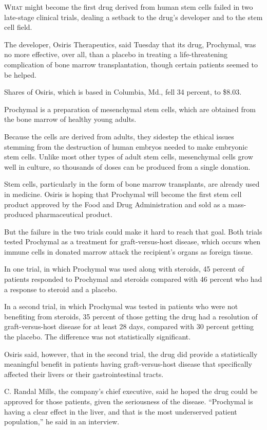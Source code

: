 ﻿\documentclass[12pt]{article}
\begin{document}
\lettrine{W}{hat} might become the first drug derived from human stem cells failed in two late-stage
clinical trials, dealing a setback to the drug's developer and to the stem cell field.

The developer, Osiris Therapeutics, said Tuesday that its drug, Prochymal, was no more effective,
over all, than a placebo in treating a life-threatening complication of bone marrow transplantation,
though certain patients seemed to be helped.

Shares of Osiris, which is based in Columbia, Md., fell 34 percent, to \$8.03.

Prochymal is a preparation of mesenchymal stem cells, which are obtained from the bone marrow of
healthy young adults.

Because the cells are derived from adults, they sidestep the ethical issues stemming from the
destruction of human embryos needed to make embryonic stem cells. Unlike most other types of adult
stem cells, mesenchymal cells grow well in culture, so thousands of doses can be produced from a
single donation.

Stem cells, particularly in the form of bone marrow transplants, are already used in medicine.
Osiris is hoping that Prochymal will become the first stem cell product approved by the Food and
Drug Administration and sold as a mass-produced pharmaceutical product.

But the failure in the two trials could make it hard to reach that goal. Both trials tested
Prochymal as a treatment for graft-versus-host disease, which occurs when immune cells in donated
marrow attack the recipient's organs as foreign tissue.

In one trial, in which Prochymal was used along with steroids, 45 percent of patients responded to
Prochymal and steroids compared with 46 percent who had a response to steroid and a placebo.

In a second trial, in which Prochymal was tested in patients who were not benefiting from steroids,
35 percent of those getting the drug had a resolution of graft-versus-host disease for at least 28
days, compared with 30 percent getting the placebo. The difference was not statistically
significant.

Osiris said, however, that in the second trial, the drug did provide a statistically meaningful
benefit in patients having graft-versus-host disease that specifically affected their livers or
their gastrointestinal tracts.

C. Randal Mills, the company's chief executive, said he hoped the drug could be approved for those
patients, given the seriousness of the disease. ``Prochymal is having a clear effect in the liver,
and that is the most underserved patient population,'' he said in an interview.
\end{document}
